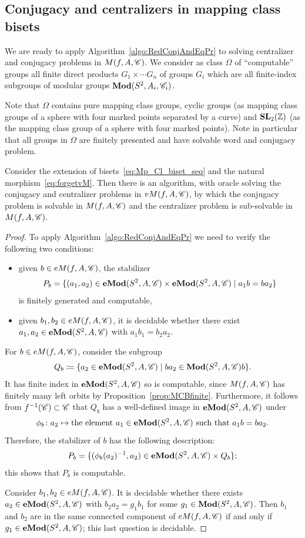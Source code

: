 \documentclass{amsart}
\begin{document}
\subsection{Conjugacy and centralizers in mapping class bisets}
We are ready to apply Algorithm~\ref{algo:RedConjAndEqPr} to solving
centralizer and conjugacy problems in $M(f,A,\CC)$. We consider as
class $\Omega$ of ``computable'' groups all finite direct products
$G_1\times\cdots G_n$ of groups $G_i$ which are all finite-index
subgroups of modular groups $\Mod(S^2,A_i,\CC_i)$.

Note that $\Omega$ contains pure mapping class groups, cyclic groups
(as mapping class groups of a sphere with four marked points separated
by a curve) and $\SL_2(\Z)$ (as the mapping class group of a sphere
with four marked points). Note in particular that all groups in
$\Omega$ are finitely presented and have solvable word and conjugacy
problem.

\begin{prop}\label{prop:AbSubBisets}
  Consider the extension of bisets~\eqref{eq:Mp_Cl_biset_seq} and the natural morphism~\eqref{eq:forgetvM}. Then
  there is an algorithm, with oracle solving the conjugacy and
  centralizer problems in $vM(f,A,\CC)$, by which the conjugacy
  problem is solvable in $M(f,A,\CC)$ and the centralizer problem is
  sub-solvable in $M(f,A,\CC)$.
\end{prop}
\begin{proof}
  To apply Algorithm~\ref{algo:RedConjAndEqPr} we need to verify the
  following two conditions:
  \begin{itemize}
  \item given $b\in eM(f,A,\CC)$, the stabilizer
    \[P_b=\{(a_1,a_2)\in\Mod[e](S^2,A,\CC)\times \Mod[e](S^2,A,\CC)\mid a_1b=b a_2\}\]
    is finitely generated and computable,
  \item given $b_1,b_2\in eM(f,A,\CC)$, it is decidable whether there
    exist $a_1,a_2\in\Mod[e](S^2,A,\CC)$ with $a_1b_1=b_2a_2$.
  \end{itemize}

  For $b\in eM(f,A,\CC)$, consider the subgroup
  \[Q_b\coloneqq\{a_2\in\Mod[e](S^2,A,\CC)\mid b a_2\in\Mod(S^2,A,\CC)b\}.
  \]
  It has finite index in $\Mod[e](S^2,A,\CC)$ so is computable, since
  $M(f,A,\CC)$ has finitely many left orbits by
  Proposition~\ref{prop:MCBfinite}. Furthermore, it follows from
  $f^{-1}(\CC)\subset \CC$ that $Q_b$ has a well-defined image in
  $\Mod[e](S^2,A,\CC)$ under
  \[\phi_b\colon a_2\mapsto \text{the element $a_1\in\Mod[e](S^2,A,\CC)$ such that
  }a_1b=b a_2.
  \]
  Therefore, the stabilizer of $b$ has the following description:
  \[P_b=\{(\phi_b(a_2)^{-1},a_2)\in\Mod[e](S^2,A,\CC)\times Q_b\};\]
  this shows that $P_b$ is computable.

  Consider $b_1,b_2\in eM(f,A,\CC)$. It is decidable whether there
  exists $a_2\in\Mod[e](S^2,A,\CC)$ with $b_2a_2=g_1b_1$ for some
  $g_1\in\Mod(S^2,A,\CC)$. Then $b_1$ and $b_2$ are in the same
  connected component of $eM(f,A,\CC)$ if and only if
  $g_1\in\Mod[e](S^2,A,\CC)$; this last question is decidable.
\end{proof}
\end{document}
